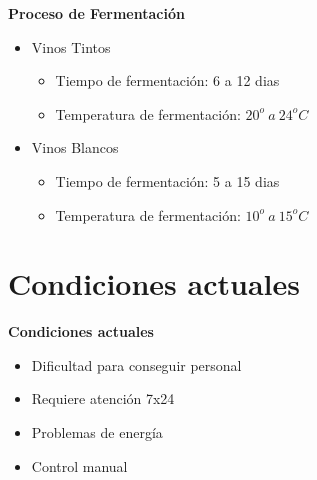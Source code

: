 \documentclass[11pt]{beamer}
\begin{document}
\begin{frame}{\LARGE{\textbf{Proceso de Fermentación}}}
  \fontsize{18pt}{18}\selectfont
  \vspace{-30px}
  \begin{itemize}
      \vspace{15px}
    \item Vinos Tintos
      \vspace{5px}
      \begin{itemize}
        \item Tiempo de fermentación: 6 a 12 dias
        \vspace{5px}
        \item Temperatura de fermentación: $20^o\ a\ 24^oC$
      \end{itemize}
        \vspace{15px}
      \item Vinos Blancos
        \vspace{5px}
        \begin{itemize}
          \item Tiempo de fermentación: 5 a 15 dias
          \vspace{5px}
          \item Temperatura de fermentación: $10^o\ a\ 15^oC$
        \end{itemize}
  \end{itemize}	
\end{frame}


\section[Problema]{Condiciones actuales}

\begin{frame}{\textbf{\LARGE{Condiciones actuales}}}
  \fontsize{18pt}{18}\selectfont
  \begin{itemize}
    \item { Dificultad para conseguir personal }
        \vspace{20px}
    \item Requiere atención 7x24
        \vspace{20px}
    \item Problemas de energía
        \vspace{20px}
    \item Control manual
  \end{itemize}
\end{frame}
\end{document}
